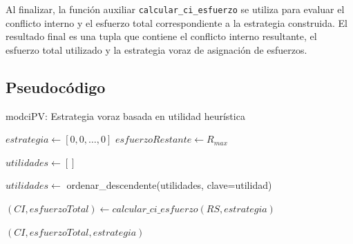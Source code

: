\documentclass[11pt,letter]{article}
\begin{document}
    Al finalizar, la función auxiliar \texttt{calcular\_ci\_esfuerzo} se utiliza para evaluar el conflicto interno y el esfuerzo total correspondiente a la estrategia construida. El resultado final es una tupla que contiene el conflicto interno resultante, el esfuerzo total utilizado y la estrategia voraz de asignación de esfuerzos.

    \subsection{Pseudocódigo}
    \begin{algorithm}[H]
        \caption{modciPV: Estrategia voraz basada en utilidad heurística}

        $estrategia \leftarrow [0, 0, \ldots, 0]$ 
        $esfuerzoRestante \leftarrow R_{max}$

        $utilidades \leftarrow []$ 


        $utilidades \leftarrow$ ordenar\_descendente(utilidades, clave=utilidad)


        $(CI, esfuerzoTotal) \leftarrow calcular\_ci\_esfuerzo(RS, estrategia)$

        \Return $(CI, esfuerzoTotal, estrategia)$
    \end{algorithm}
\end{document}
